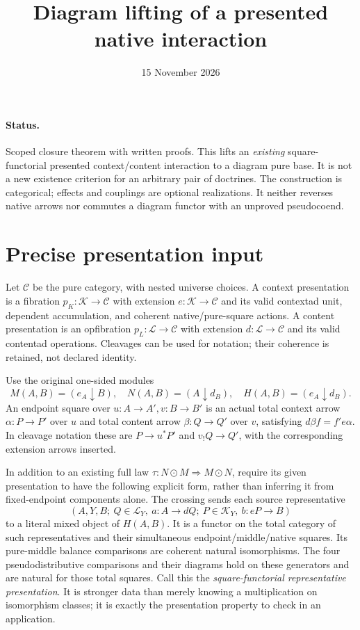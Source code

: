 \documentclass[11pt]{article}
\title{Diagram lifting of a presented native interaction}
\date{15 November 2026}
\begin{document}
\maketitle
\paragraph{Status.} Scoped closure theorem with written proofs. This lifts an \emph{existing} square-functorial presented context/content interaction to a diagram pure base. It is not a new existence criterion for an arbitrary pair of doctrines. The construction is categorical; effects and couplings are optional realizations. It neither reverses native arrows nor commutes a diagram functor with an unproved pseudocoend.

\section{Precise presentation input}
Let $\mathcal C$ be the pure category, with nested universe choices. A context presentation is a fibration $p_K:\mathcal K\to\mathcal C$ with extension $e:\mathcal K\to\mathcal C$ and its valid contextad unit, dependent accumulation, and coherent native/pure-square actions. A content presentation is an opfibration $p_L:\mathcal L\to\mathcal C$ with extension $d:\mathcal L\to\mathcal C$ and its valid contentad operations. Cleavages can be used for notation; their coherence is retained, not declared identity.

Use the original one-sided modules
\[
 M(A,B)=(e_A\downarrow B),\quad N(A,B)=(A\downarrow d_B),\quad H(A,B)=(e_A\downarrow d_B).
\]
An endpoint square over $u:A\to A',v:B\to B'$ is an actual total context arrow $\alpha:P\to P'$ over $u$ and total content arrow $\beta:Q\to Q'$ over $v$, satisfying $d\beta f=f'e\alpha$. In cleavage notation these are $P\to u^*P'$ and $v_!Q\to Q'$, with the corresponding extension arrows inserted.

In addition to an existing full law $\tau:N\odot M\Rightarrow M\odot N$, require its given presentation to have the following explicit form, rather than inferring it from fixed-endpoint components alone. The crossing sends each source representative
\[
 (A,Y,B;\ Q\in\mathcal L_Y,\ a:A\to dQ;\ P\in\mathcal K_Y,\ b:eP\to B)
\tag{R}
\]
to a literal mixed object of $H(A,B)$. It is a functor on the total category of such representatives and their simultaneous endpoint/middle/native squares. Its pure-middle balance comparisons are coherent natural isomorphisms. The four pseudodistributive comparisons and their diagrams hold on these generators and are natural for those total squares. Call this the \emph{square-functorial representative presentation}. It is stronger data than merely knowing a multiplication on isomorphism classes; it is exactly the presentation property to check in an application.
\end{document}
